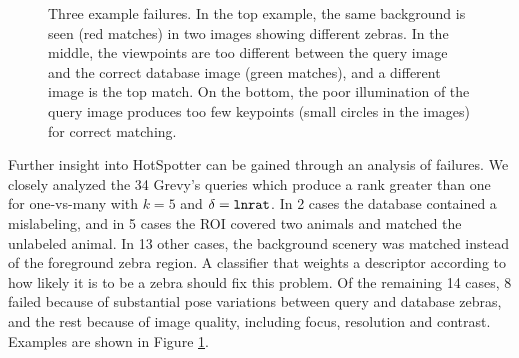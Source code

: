 \begin{figure}
\begin{center}
\begin{tabular}{c}
\end{tabular}
\caption{\footnotesize{Three example failures.  In the top example, the same
  background is seen (red matches) in two images showing different zebras.  In
  the middle, the viewpoints are too different between the query image
  and the correct database image (green matches), and a different
  image is the top match.  On the bottom, the poor illumination of
  the query image produces too few keypoints (small circles in the
  images) for correct matching.}}
\label{fig:problem}
\end{center}
\end{figure}

Further insight into HotSpotter can be gained through an analysis of
failures.  We closely analyzed the 34 Grevy's queries which produce a rank greater than
one for one-vs-many with $k=5$ and $\delta={\textrm{\tt lnrat}}$.
In 2 cases the database contained a mislabeling, and in 5 cases the
ROI covered two animals and matched the unlabeled animal. In 13 other cases,
the background scenery was matched instead of the
foreground zebra region.  A classifier that weights a descriptor
according to how likely it is to be a zebra should fix this problem.
Of the remaining 14 cases, 8 failed because of substantial pose variations between query
and database zebras, and the rest because of image quality, including focus,
resolution and contrast.  Examples are shown in Figure \ref{fig:problem}.
